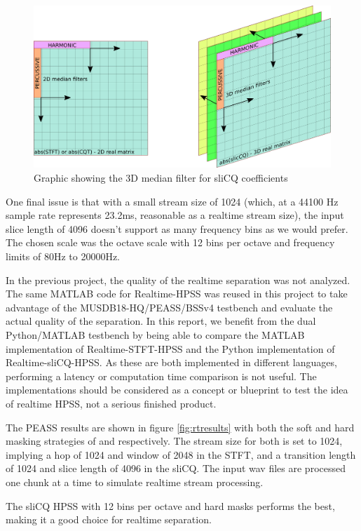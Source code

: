 \documentclass[letter,12pt]{article}
\begin{document}
\begin{appendices}
\begin{figure}[ht]
	\centering
	\includegraphics[width=14cm]{./3dmfilt.png}
	\caption{Graphic showing the 3D median filter for sliCQ coefficients}
	\label{fig:3dmfilt}
\end{figure}

One final issue is that with a small stream size of 1024 (which, at a 44100 Hz sample rate represents 23.2ms, reasonable as a realtime stream size), the input slice length of 4096 doesn't support as many frequency bins as we would prefer. The chosen scale was the octave scale with 12 bins per octave and frequency limits of 80Hz to 20000Hz.

In the previous project, the quality of the realtime separation was not analyzed. The same MATLAB code for Realtime-HPSS was reused in this project to take advantage of the MUSDB18-HQ/PEASS/BSSv4 testbench and evaluate the actual quality of the separation. In this report, we benefit from the dual Python/MATLAB testbench by being able to compare the MATLAB implementation of Realtime-STFT-HPSS and the Python implementation of Realtime-sliCQ-HPSS. As these are both implemented in different languages, performing a latency or computation time comparison is not useful. The implementations should be considered as a concept or blueprint to test the idea of realtime HPSS, not a serious finished product.

The PEASS results are shown in figure \ref{fig:rtresults} with both the soft and hard masking strategies of \citet{fitzgerald1} and \citet{driedger} respectively. The stream size for both is set to 1024, implying a hop of 1024 and window of 2048 in the STFT, and a transition length of 1024 and slice length of 4096 in the sliCQ. The input wav files are processed one chunk at a time to simulate realtime stream processing.

The sliCQ HPSS with 12 bins per octave and hard masks performs the best, making it a good choice for realtime separation.


\end{appendices}
\end{document}
